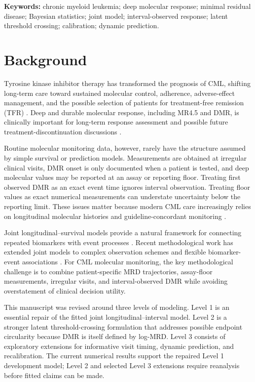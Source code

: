 \documentclass[11pt]{article}
\begin{document}
\noindent\textbf{Keywords:} chronic myeloid leukemia; deep molecular response; minimal residual disease; Bayesian statistics; joint model; interval-observed response; latent threshold crossing; calibration; dynamic prediction.

\section{Background}

Tyrosine kinase inhibitor therapy has transformed the prognosis of CML, shifting long-term care toward sustained molecular control, adherence, adverse-effect management, and the possible selection of patients for treatment-free remission (TFR) \cite{Hochhaus2020ELN,Jabbour2025JAMAReview,Haddad2026Algorithms,Senapati2023CMLManagement}. Deep and durable molecular response, including MR4.5 and DMR, is clinically important for long-term response assessment and possible future treatment-discontinuation discussions \cite{Hughes2014EarlyMolecularResponse,Rasekh2026TFRPredictor,Ono2026MR45,Takahashi2026JSKI}.

Routine molecular monitoring data, however, rarely have the structure assumed by simple survival or prediction models. Measurements are obtained at irregular clinical visits, DMR onset is only documented when a patient is tested, and deep molecular values may be reported at an assay or reporting floor. Treating first observed DMR as an exact event time ignores interval observation. Treating floor values as exact numerical measurements can understate uncertainty below the reporting limit. These issues matter because modern CML care increasingly relies on longitudinal molecular histories and guideline-concordant monitoring \cite{Kim2026BCRABLqPCR,Verweij2026RemoteMonitoring}.

Joint longitudinal--survival models provide a natural framework for connecting repeated biomarkers with event processes \cite{Wulfsohn1997JointModel,Rizopoulos2016JMbayes}. Recent methodological work has extended joint models to complex observation schemes and flexible biomarker-event associations \cite{Lovblom2026MixedObservationJointModel,Niu2026QuantileJointModel}. For CML molecular monitoring, the key methodological challenge is to combine patient-specific MRD trajectories, assay-floor measurements, irregular visits, and interval-observed DMR while avoiding overstatement of clinical decision utility.

This manuscript was revised around three levels of modeling. Level 1 is an essential repair of the fitted joint longitudinal--interval model. Level 2 is a stronger latent threshold-crossing formulation that addresses possible endpoint circularity because DMR is itself defined by log-MRD. Level 3 consists of exploratory extensions for informative visit timing, dynamic prediction, and recalibration. The current numerical results support the repaired Level 1 development model; Level 2 and selected Level 3 extensions require reanalysis before fitted claims can be made.
\end{document}
